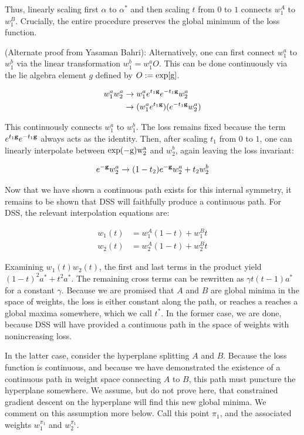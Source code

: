 \documentclass[twocolumn,superscriptaddress,aps,prb,floatfix]{revtex4-1}
\begin{document}
  Thus, linearly scaling first $\alpha$ to $\alpha^*$ and then scaling $t$ from $0$ to $1$ connects $w_1^A$ to $w_1^B$.  Crucially, the entire procedure preserves the global minimum of the loss function.  
  
  (Alternate proof from Yasaman Bahri): Alternatively, one can first connect $w_1^a$ to $w_1^b$ via the linear transformation $w_1^b =  w_1^a O$.  This can be done continuously via the lie algebra element $g$ defined by $O := \rm{exp}[g]$.

 \begin{align}
 w_1^a w_2^a &\rightarrow w_1^a e^{t_1 \bold{g}} e^{-t_1 \bold{g}} w_2^a \\ \notag
 &\rightarrow (w_1^a e^{t_1 \bold{g}}) ( e^{-t_1 \bold{g}} w_2^a)
  \end{align}
  
  This continuously connects $w_1^a$ to $w_1^b$.  The loss remains fixed because the term $e^{t_1 \bold{g}} e^{-t_1 \bold{g}}$ always acts as the identity.  Then, after scaling $t_1$ from $0$ to $1$, one can linearly interpolate between $\rm{exp} (-g) w_2^a$ and $w_2^b$, again leaving the loss invariant:
  
  \begin{equation}
 e^{-\bold{g}} w_2^a \rightarrow (1-t_2) e^{-\bold{g}} w_2^a + t_2 w_2^b
  \end{equation}
 
  Now that we have shown a continuous path exists for this internal symmetry, it remains to be shown that DSS will faithfully produce a continuous path.  For DSS, the relevant interpolation equations are:
  
  \begin{align}
  w_1(t) &= w_1^A (1-t) + w_1^B t \\
  w_2(t) &= w_2^A (1-t) + w_2^B t
  \end{align}
  
  Examining $w_1(t) w_2(t)$, the first and last terms in the product yield $(1-t)^2 a^* + t^2 a^*$.  The remaining cross terms can be rewritten as $\gamma t(t-1) a^*$ for a constant $\gamma$.  Because we are promised that $A$ and $B$ are global minima in the space of weights, the loss is either constant along the path, or reaches a reaches a global maxima somewhere, which we call $t^*$.  In the former case, we are done, because DSS will have provided a continuous path in the space of weights with nonincreasing loss.
 
  In the latter case, consider the hyperplane splitting $A$ and $B$.  Because the loss function is continuous, and because we have demonstrated the existence of a continuous path in weight space connecting $A$ to $B$, this path must puncture the hyperplane somewhere.  We assume, but do not prove here, that constrained gradient descent on the hyperplane will find this new global minima.  We comment on this assumption more below.  Call this point $\pi_1$, and the associated weights $w^{\pi_1}_1$ and $w^{\pi_1}_2$.
  
\end{document}
